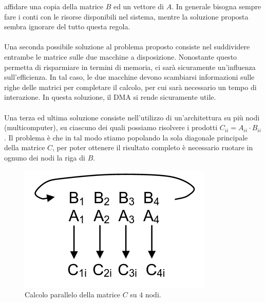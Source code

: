 affidare una copia della matrice \(B\) ed un vettore di \(A\). In generale bisogna sempre fare i conti con le risorse disponibili nel sistema, mentre la soluzione proposta sembra ignorare del tutto questa regola. 
\\
\\
Una seconda possibile soluzione al problema proposto consiste nel suddividere entrambe le matrice sulle due macchine a disposizione. Nonostante questo permetta di risparmiare in termini di memoria, ci sarà sicuramente un'influenza sull'efficienza. In tal caso, le due macchine devono scambiarsi informazioni sulle righe delle matrici per completare il calcolo, per cui sarà necessario un tempo di interazione. In questa soluzione, il DMA si rende sicuramente utile.
\\
\\
Una terza ed ultima soluzione consiste nell'utilizzo di un'architettura su più nodi (multicomputer), su ciascuno dei quali possiamo risolvere i prodotti \(C_{ii}=A_{ii}\cdot B_{ii}\). Il problema è che in tal modo stiamo popolando la sola diagonale principale della matrice \(C\), per poter ottenere il risultato completo è necessario ruotare in ognuno dei nodi la riga di \(B\).
\begin{figure}[!h]
    \centering
    \includegraphics[width=0.3\linewidth]{img/matrix.png}
    \caption{Calcolo parallelo della matrice \(C\) su \(4\) nodi.}
    \label{fig:matrix}
\end{figure}


